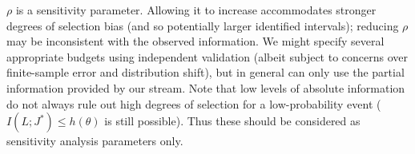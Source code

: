 $\rho$ is a sensitivity parameter. Allowing it to increase accommodates stronger degrees of selection bias (and so potentially larger identified intervals); reducing $\rho$ may be inconsistent with the observed information. We might specify several appropriate budgets using independent validation (albeit subject to concerns over finite-sample error and distribution shift), but in general can only use the partial information provided by our stream. Note that low levels of absolute information do not always rule out high degrees of selection for a low-probability event ($I(L;J^*)\le h(\theta)$ is still possible). Thus these should be considered as sensitivity analysis parameters only.
